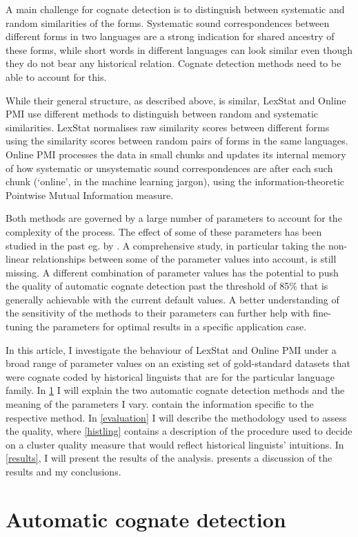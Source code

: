 \documentclass[a4paper,11pt,twocolumn]{scrartcl}
\begin{document}
A main challenge for cognate detection is to distinguish between systematic and random similarities of the forms. Systematic sound correspondences between different forms in two languages are a strong indication for shared ancestry of these forms, while short words in different languages can look similar even though they do not bear any historical relation. Cognate detection methods need to be able to account for this.

While their general structure, as described above, is similar, LexStat and Online PMI use different methods to distinguish between random and systematic similarities. LexStat normalises raw similarity scores between different forms using the similarity scores between random pairs of forms in the same languages. Online PMI processes the data in small chunks and updates its internal memory of how systematic or unsystematic sound correspondences are after each such chunk (‘online’, in the machine learning jargon), using the information-theoretic Pointwise Mutual Information measure.

Both methods are governed by a large number of parameters to account for the complexity of the process. The effect of some of these parameters has been studied in the past eg. by \textcite{list2017potential}. A comprehensive study, in particular taking the non-linear relationships between some of the parameter values into account, is still missing. A different combination of parameter values has the potential to push the quality of automatic cognate detection past the threshold of 85\% that is generally achievable with the current default values. A better understanding of the sensitivity of the methods to their parameters can further help with fine-tuning the parameters for optimal results in a specific application case.

In this article, I investigate the behaviour of LexStat and Online PMI under a broad range of parameter values on an existing set of gold-standard datasets that were cognate coded by historical linguists that are for the particular language family.
In \cref{acd} I will explain the two automatic cognate detection methods and the meaning of the parameters I vary.  contain the information specific to the respective method.
In \cref{evaluation} I will describe the methodology used to assess the quality, where \cref{histling} contains a description of the procedure used to decide on a cluster quality measure that would reflect historical linguists' intuitions.
In \cref{results}, I will present the results of the analysis.  presents a discussion of the results and my conclusions.

\section{Automatic cognate detection}
\label{acd}

\printbibliography
\end{document}

